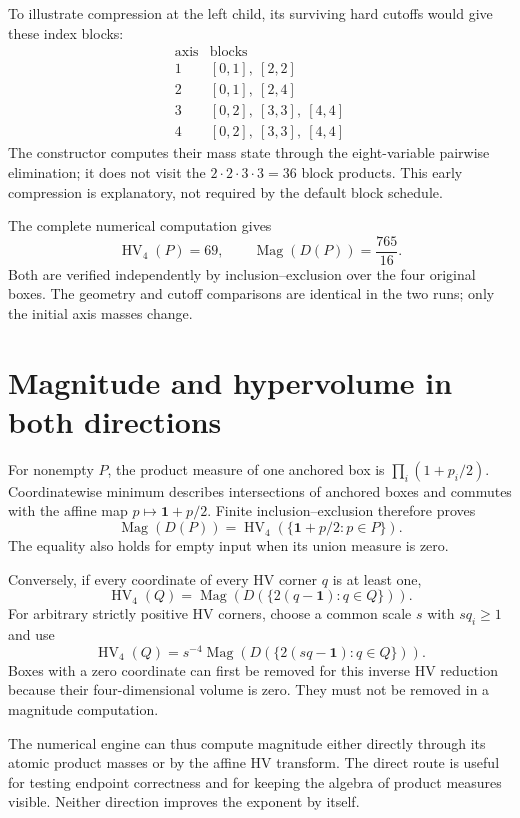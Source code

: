 \documentclass[12pt,a4paper]{article}
\theoremstyle{remark}
\newcommand{\HV}{\operatorname{HV}}
\newcommand{\Mag}{\operatorname{Mag}}
\newcommand{\1}{\mathbf1}
\begin{document}
To illustrate compression at the left child, its surviving hard cutoffs
would give these index blocks:
\[
\begin{array}{c|l}
\text{axis}&\text{blocks}\\\hline
1 &[0,1],\ [2,2]\\
2 &[0,1],\ [2,4]\\
3 &[0,2],\ [3,3],\ [4,4]\\
4 &[0,2],\ [3,3],\ [4,4]
\end{array}
\]
The constructor computes their mass state through the eight-variable
pairwise elimination; it does not visit the $2\cdot2\cdot3\cdot3=36$
block products. This early compression is explanatory, not required by
the default block schedule.

The complete numerical computation gives
\[
                   \HV_4(P)=69,\qquad
                   \Mag(D(P))=\frac{765}{16}.
\]
Both are verified independently by inclusion--exclusion over the four
original boxes. The geometry and cutoff comparisons are identical in
the two runs; only the initial axis masses change.

\section{Magnitude and hypervolume in both directions}
For nonempty $P$, the product measure of one anchored box is
$\prod_i(1+p_i/2)$. Coordinatewise minimum describes intersections of
anchored boxes and commutes with the affine map $p\mapsto\1+p/2$.
Finite inclusion--exclusion therefore proves
\begin{equation}
              \Mag(D(P))=\HV_4(\{\1+p/2:p\in P\}).    \label{eq:affine}
\end{equation}
The equality also holds for empty input when its union measure is zero.

Conversely, if every coordinate of every HV corner $q$ is at least one,
\[
                    \HV_4(Q)=\Mag(D(\{2(q-\1):q\in Q\})).
\]
For arbitrary strictly positive HV corners, choose a common scale
$s$ with $sq_i\ge1$ and use
\[
                    \HV_4(Q)=s^{-4}
                    \Mag(D(\{2(sq-\1):q\in Q\})).
\]
Boxes with a zero coordinate can first be removed for this inverse HV
reduction because their four-dimensional volume is zero. They must not
be removed in a magnitude computation.

The numerical engine can thus compute magnitude either directly through
its atomic product masses or by the affine HV transform. The direct
route is useful for testing endpoint correctness and for keeping the
algebra of product measures visible. Neither direction improves the
exponent by itself.
\end{document}
